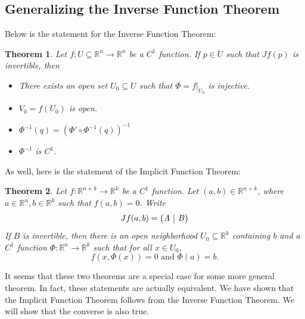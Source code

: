 \documentclass{article}
\theoremstyle{plain} %
\newtheorem{thm}{Theorem}
\numberwithin{thm}{section} %
\theoremstyle{definition}
\begin{document}
    \subsection{Generalizing the Inverse Function Theorem}
    Below is the statement for the Inverse Function Theorem:
    \begin{thm}
        Let \(f: U \subseteq \mathbb{R}^n \to \mathbb{R}^n\) be a \(C^1\) function. If \(p \in U\) such that \(Jf(p)\) is invertible, then
        \begin{itemize}
            \item There exists an open set \(U_0 \subseteq U\) such that \(\Phi = f | _{U_0}\) is injective.
            \item \(V_0 = f(U_0)\) is open.
            \item \(\Phi ^{-1}(q) = (\Phi ' \circ \Phi^{-1}(q))^{-1}\)
            \item \(\Phi ^{-1}\) is \(C^1\).
        \end{itemize}
    \end{thm}
    As well, here is the statement of the Implicit Function Theorem:
    \begin{thm}
        Let \(f: \mathbb{R}^{n + k}\to \mathbb{R}^k\) be a \(C^1\) function. Let \((a,b) \in \mathbb{R}^{n+k}\), where \(a \in \mathbb{R}^n, b \in \mathbb{R}^k\)  such that \(f(a,b) = 0\). Write
        \[
            J f (a,b) = \left( \begin{array}{@{}c|c@{}}
                A & B
            \end{array} \right) 
        \]
        If \(B\) is invertible, then there is an open neighborhood \(U_0 \subseteq \mathbb{R}^k\) containing \(b\) and a \(C^1\) function \(\Phi : \mathbb{R}^n \to \mathbb{R}^k\) such that for all \(x \in U_0\),
        \[
            f(x, \Phi (x)) = 0 \text{ and } \Phi (a) = b.
        \]
    \end{thm}
    It seems that these two theorems are a special case for some more general theorem. In fact, these statements are actually equivalent. We have shown that the Implicit Function Theorem follows from the Inverse Function Theorem. We will show that the converse is also true.
\end{document}
